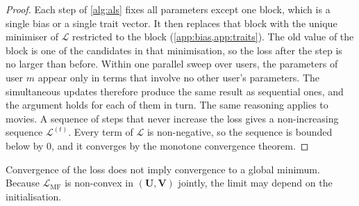 \documentclass{article}
\theoremstyle{plain}
\theoremstyle{definition}
\theoremstyle{remark}
\begin{document}
\begin{proof}
Each step of \cref{alg:als} fixes all parameters except one block, which is
a single bias or a single trait vector. It then replaces that block with
the unique minimiser of $\mathcal{L}$ restricted to the block
(\cref{app:bias,app:traits}). The old value of the block is one of the
candidates in that minimisation, so the loss after the step is no larger
than before. Within one parallel sweep over users, the parameters of user
$m$ appear only in terms that involve no other user's parameters. The
simultaneous updates therefore produce the same result as sequential ones,
and the argument holds for each of them in turn. The same reasoning applies
to movies. A sequence of steps that never increase the loss gives a
non-increasing sequence $\mathcal{L}^{(t)}$. Every term of $\mathcal{L}$ is
non-negative, so the sequence is bounded below by $0$, and it converges by
the monotone convergence theorem.
\end{proof}

Convergence of the loss does not imply convergence to a global minimum.
Because $\mathcal{L}_{\text{MF}}$ is non-convex in
$(\mathbf{U}, \mathbf{V})$ jointly, the limit may depend on the
initialisation.
\end{document}
